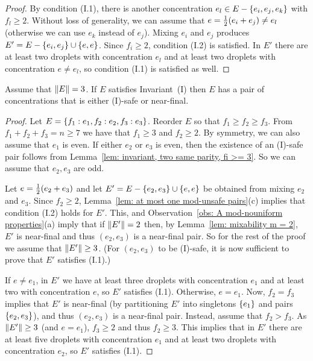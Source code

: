 \begin{proof}
	By condition (I.1), there is another concentration $e_l\in E - { \left\{ e_i,e_j,e_k \right\} }$
	with $f_l\ge 2$.
	Without loss of generality, we can assume that $e = {\textstyle\frac{1}{2}}(e_i+e_j)\neq e_l$ (otherwise we can
	use $e_k$ instead of $e_j$).
	Mixing $e_i$ and $e_j$ produces $E' = E - { \left\{ e_i,e_j \right\} }\cup { \left\{ e,e \right\} }$.
	Since $f_i\ge 2$, condition (I.2) is satisfied.
	In $E'$ there are at least two droplets with concentration $e_l$
	and at least two droplets with concentration $e\neq e_l$, so
	condition (I.1) is satisfied as well.
\end{proof}


\begin{lemma}%
	\label{lem: m = 3, preserves invariant}
	Assume that ${\|E\|}=3$.
	If $E$ satisfies Invariant~(I) then $E$ has a pair of concentrations
	that is either (I)-safe or near-final.
\end{lemma}%

\begin{proof}
	Let $E = { \left\{ f_1:e_1, f_2:e_2, f_3:e_3 \right\} }$. Reorder $E$ so that
	$f_1\geq f_2 \geq f_3$. From $f_1+f_2+f_3 = n \ge 7$
	we have that $f_1\ge 3$ and $f_2\ge 2$. By symmetry, we can
	also assume that $e_1$ is even. 
	If either $e_2$ or $e_3$ is even, then the existence of an (I)-safe pair follows from
	Lemma~\ref{lem: invariant, two same parity, fi >= 3}.
	So we can assume that $e_2,e_3$ are odd.
	
	Let $e = {\textstyle\frac{1}{2}}(e_2+e_3)$ and let $E' = E-{ \left\{ e_2,e_3 \right\} }\cup{ \left\{ e,e \right\} }$ 
	be obtained from mixing $e_2$ and $e_3$. 	
	Since $f_2 \ge 2$, Lemma~\ref{lem: at most one mod-unsafe pairs}(c) implies that
	condition (I.2) holds for $E'$.
	This, and Observation~\ref{obs: A mod-nouniform properties}(a) imply that if 
	${\|E'\|} = 2$ then, by Lemma~\ref{lem: mixability m = 2},
	$E'$ is near-final and thus $(e_2,e_3)$ is a near-final pair.
	So for the rest of the proof we assume that ${\|E'\|}\ge 3$.
	(For $(e_2,e_3)$ to be (I)-safe, it is now sufficient to prove that $E'$ satisfies (I.1).)
	
	If $e\neq e_1$, in $E'$
	we have at least three droplets with concentration $e_1$ and at least
	two with concentration $e$, so $E'$ satisfies (I.1).
	Otherwise, $e = e_1$. 
	Now, $f_2 = f_3$ implies that $E'$ is near-final 
	(by partitioning $E'$ into singletons ${ \left\{ e_1 \right\} }$ and pairs ${ \left\{ e_2,e_3 \right\} }$),
	and thus $(e_2,e_3)$ is a near-final pair.
	Instead, assume that $f_2 > f_3$.
	As ${\|E'\|}\ge 3$ (and $e = e_1$), $f_3 \ge 2$ and thus $f_2\ge 3$. 
	This implies that in $E'$ there are at least five droplets with concentration $e_1$ and at least
	two droplets with concentration $e_2$, so $E'$ satisfies (I.1).
\end{proof}


